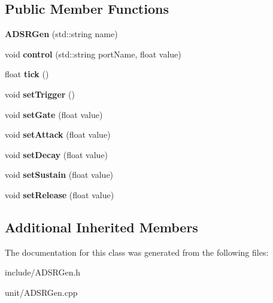\subsection*{Public Member Functions}
\begin{DoxyCompactItemize}
\item 
\hypertarget{classunit_1_1ADSRGen_a7e2d63eecbe51fc86a93697dd4d47964}{{\bfseries A\-D\-S\-R\-Gen} (std\-::string name)}\label{classunit_1_1ADSRGen_a7e2d63eecbe51fc86a93697dd4d47964}

\item 
\hypertarget{classunit_1_1ADSRGen_ac43bddd25b9a84f0ad6b299ed55f5133}{void {\bfseries control} (std\-::string port\-Name, float value)}\label{classunit_1_1ADSRGen_ac43bddd25b9a84f0ad6b299ed55f5133}

\item 
\hypertarget{classunit_1_1ADSRGen_a91a149fa5065d94dccec224b18710a24}{float {\bfseries tick} ()}\label{classunit_1_1ADSRGen_a91a149fa5065d94dccec224b18710a24}

\item 
\hypertarget{classunit_1_1ADSRGen_a8685be5cffea6ec29dc1ebdc44402f70}{void {\bfseries set\-Trigger} ()}\label{classunit_1_1ADSRGen_a8685be5cffea6ec29dc1ebdc44402f70}

\item 
\hypertarget{classunit_1_1ADSRGen_aee81e429433522eeb6362338fe15d551}{void {\bfseries set\-Gate} (float value)}\label{classunit_1_1ADSRGen_aee81e429433522eeb6362338fe15d551}

\item 
\hypertarget{classunit_1_1ADSRGen_a3a81f7181fa8b63f4ec5ff9da91cb8b3}{void {\bfseries set\-Attack} (float value)}\label{classunit_1_1ADSRGen_a3a81f7181fa8b63f4ec5ff9da91cb8b3}

\item 
\hypertarget{classunit_1_1ADSRGen_a14856bf0586881cbe088ab47918b7d72}{void {\bfseries set\-Decay} (float value)}\label{classunit_1_1ADSRGen_a14856bf0586881cbe088ab47918b7d72}

\item 
\hypertarget{classunit_1_1ADSRGen_a07fa6e650dc1ffdde91fc0721d4a8dc8}{void {\bfseries set\-Sustain} (float value)}\label{classunit_1_1ADSRGen_a07fa6e650dc1ffdde91fc0721d4a8dc8}

\item 
\hypertarget{classunit_1_1ADSRGen_a8c2a3e60dcae34d077b5983b1584de71}{void {\bfseries set\-Release} (float value)}\label{classunit_1_1ADSRGen_a8c2a3e60dcae34d077b5983b1584de71}

\end{DoxyCompactItemize}
\subsection*{Additional Inherited Members}


The documentation for this class was generated from the following files\-:\begin{DoxyCompactItemize}
\item 
include/A\-D\-S\-R\-Gen.\-h\item 
unit/A\-D\-S\-R\-Gen.\-cpp\end{DoxyCompactItemize}
